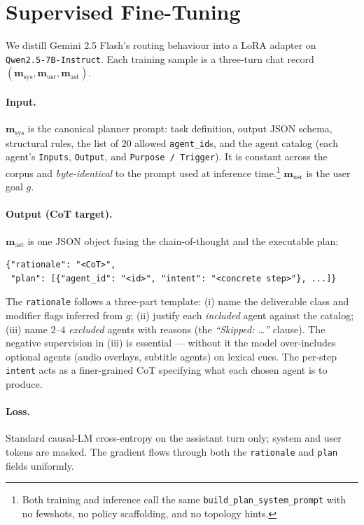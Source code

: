 \section{Supervised Fine-Tuning}
\label{sec:sft}

We distill Gemini 2.5 Flash's routing behaviour into a LoRA adapter on
\texttt{Qwen2.5-7B-Instruct}. Each training sample is a three-turn chat
record $(\mathbf{m}_{\text{sys}}, \mathbf{m}_{\text{usr}}, \mathbf{m}_{\text{ast}})$.

\paragraph{Input.}
$\mathbf{m}_{\text{sys}}$ is the canonical planner prompt: task definition,
output JSON schema, structural rules, the list of $20$ allowed
\texttt{agent\_id}s, and the agent catalog (each agent's
\texttt{Inputs}, \texttt{Output}, and \texttt{Purpose / Trigger}).
It is constant across the corpus and \emph{byte-identical} to the
prompt used at inference time.\footnote{Both training and inference call
the same \texttt{build\_plan\_system\_prompt} with no fewshots, no
policy scaffolding, and no topology hints.}
$\mathbf{m}_{\text{usr}}$ is the user goal $g$.

\paragraph{Output (CoT target).}
$\mathbf{m}_{\text{ast}}$ is one JSON object fusing the chain-of-thought
and the executable plan:
\begin{lstlisting}[basicstyle=\ttfamily\footnotesize,breaklines=true,frame=single]
{"rationale": "<CoT>",
 "plan": [{"agent_id": "<id>", "intent": "<concrete step>"}, ...]}
\end{lstlisting}
The \texttt{rationale} follows a three-part template:
(i) name the deliverable class and modifier flags inferred from $g$;
(ii) justify each \emph{included} agent against the catalog;
(iii) name $2$--$4$ \emph{excluded} agents with reasons (the
\textit{``Skipped: \dots''} clause). The negative supervision in
(iii) is essential — without it the model over-includes optional
agents (audio overlays, subtitle agents) on lexical cues. The
per-step \texttt{intent} acts as a finer-grained CoT specifying what
each chosen agent is to produce.

\paragraph{Loss.}
Standard causal-LM cross-entropy on the assistant turn only;
system and user tokens are masked. The gradient flows through
both the \texttt{rationale} and \texttt{plan} fields uniformly.

